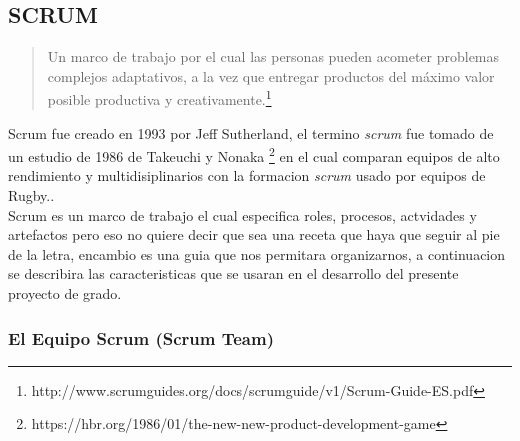 \subsection{SCRUM}
\label{sub:scrum}

  \begin{quote}

    Un marco de trabajo por el cual las personas pueden acometer problemas complejos adaptativos, a la vez que entregar productos del máximo valor posible productiva y creativamente.\footnote{http://www.scrumguides.org/docs/scrumguide/v1/Scrum-Guide-ES.pdf}

  \end{quote}

  Scrum fue creado en 1993 por Jeff Sutherland, el termino \emph{scrum} fue tomado de un estudio de 1986 de Takeuchi y Nonaka \footnote{https://hbr.org/1986/01/the-new-new-product-development-game} en el cual comparan equipos de alto rendimiento y multidisiplinarios con la formacion \emph{scrum} usado por equipos de Rugby.\cite{why_scrum}.\\

  Scrum es un marco de trabajo el cual especifica roles, procesos, actvidades y artefactos pero eso no quiere decir que sea una receta que haya que seguir al pie de la letra, encambio es una guia que nos permitara organizarnos, a continuacion se describira las caracteristicas que se usaran en el desarrollo del presente proyecto de grado.



  \subsubsection{El Equipo Scrum (Scrum Team)}
  \label{subs:scrum_team}

